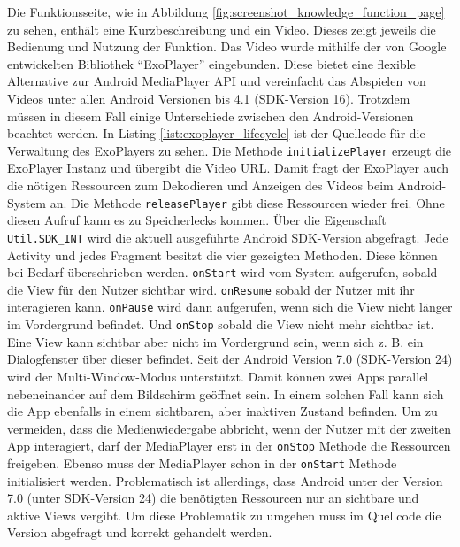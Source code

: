 Die Funktionsseite, wie in Abbildung \ref{fig:screenshot_knowledge_function_page} zu sehen, enthält eine Kurzbeschreibung und ein Video. Dieses zeigt jeweils die Bedienung und Nutzung der Funktion. Das Video wurde mithilfe der von Google entwickelten Bibliothek \enquote{ExoPlayer} eingebunden. Diese bietet eine flexible Alternative zur Android MediaPlayer \gls{API} und vereinfacht das Abspielen von Videos unter allen Android Versionen bis 4.1 (\gls{SDK}-Version 16). Trotzdem müssen in diesem Fall einige Unterschiede zwischen den Android-Versionen beachtet werden. In Listing \ref{list:exoplayer_lifecycle} ist der Quellcode für die Verwaltung des ExoPlayers zu sehen. Die Methode \texttt{initializePlayer} erzeugt die ExoPlayer Instanz und übergibt die Video \gls{URL}. Damit fragt der ExoPlayer auch die nötigen Ressourcen zum Dekodieren und Anzeigen des Videos beim Android-System an. Die Methode \texttt{releasePlayer} gibt diese Ressourcen wieder frei. Ohne diesen Aufruf kann es zu Speicherlecks kommen. Über die Eigenschaft \texttt{Util.SDK\_INT} wird die aktuell ausgeführte Android \gls{SDK}-Version abgefragt. Jede Activity und jedes Fragment besitzt die vier gezeigten Methoden. Diese können bei Bedarf überschrieben werden. \texttt{onStart} wird vom System aufgerufen, sobald die View für den Nutzer sichtbar wird. \texttt{onResume} sobald der Nutzer mit ihr interagieren kann. \texttt{onPause} wird dann aufgerufen, wenn sich die View nicht länger im Vordergrund befindet. Und \texttt{onStop} sobald die View nicht mehr sichtbar ist. Eine View kann sichtbar aber nicht im Vordergrund sein, wenn sich z. B. ein Dialogfenster über dieser befindet. Seit der Android Version 7.0 (\gls{SDK}-Version 24) wird der Multi-Window-Modus unterstützt. Damit können zwei Apps parallel nebeneinander auf dem Bildschirm geöffnet sein. In einem solchen Fall kann sich die App ebenfalls in einem sichtbaren, aber inaktiven Zustand befinden. Um zu vermeiden, dass die Medienwiedergabe abbricht, wenn der Nutzer mit der zweiten App interagiert, darf der MediaPlayer erst in der \texttt{onStop} Methode die Ressourcen freigeben. Ebenso muss der MediaPlayer schon in der \texttt{onStart} Methode initialisiert werden. Problematisch ist allerdings, dass Android unter der Version 7.0 (unter \gls{SDK}-Version 24) die benötigten Ressourcen nur an sichtbare und aktive Views vergibt. Um diese Problematik zu umgehen muss im Quellcode die Version abgefragt und korrekt gehandelt werden.

